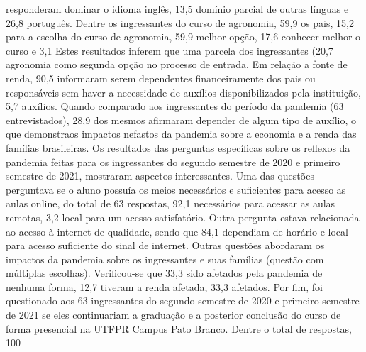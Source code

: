 responderam dominar o idioma inglês, 13,5%
domínio parcial de outras línguas e 26,8%
português. Dentre os ingressantes do curso de agronomia, 59,9%
os pais, 15,2%
para a escolha do curso de agronomia, 59,9%
melhor opção, 17,6%
conhecer melhor o curso e 3,1%
Estes resultados inferem que uma parcela dos ingressantes (20,7%
agronomia como segunda opção no processo de entrada. Em relação a fonte de renda, 90,5%
informaram serem dependentes financeiramente dos pais ou responsáveis sem haver a necessidade
de auxílios disponibilizados pela instituição, 5,7%
auxílios. Quando comparado aos ingressantes do período da pandemia (63 entrevistados), 28,9%
dos mesmos afirmaram depender de algum tipo de auxílio, o que demonstraos impactos nefastos da
pandemia sobre a economia e a renda das famílias brasileiras.
Os resultados das perguntas específicas sobre os reflexos da pandemia feitas para os
ingressantes do segundo semestre de 2020 e primeiro semestre de 2021, mostraram aspectos
interessantes. Uma das questões perguntava se o aluno possuía os meios necessários e suficientes
para acesso as aulas online, do total de 63 respostas, 92,1%
necessários para acessar as aulas remotas, 3,2%
local para um acesso satisfatório. Outra pergunta estava relacionada ao acesso à internet de
qualidade, sendo que 84,1%
dependiam de horário e local para acesso suficiente do sinal de internet.
Outras questões abordaram os impactos da pandemia sobre os ingressantes e suas famílias
(questão com múltiplas escolhas). Verificou-se que 33,3%
sido afetados pela pandemia de nenhuma forma, 12,7%
tiveram a renda afetada, 33,3%
afetados. Por fim, foi questionado aos 63 ingressantes do segundo semestre de 2020 e primeiro 
semestre de 2021 se eles continuariam a graduação e a posterior conclusão do curso de forma 
presencial na UTFPR Campus Pato Branco. Dentre o total de respostas, 100%
